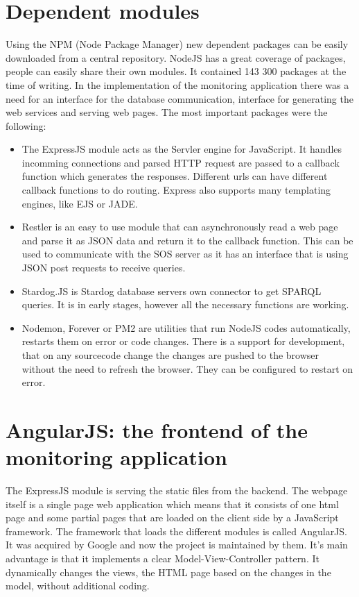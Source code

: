 \section{Dependent modules}

Using the NPM (Node Package Manager) new dependent packages can be easily downloaded from a central  repository. NodeJS has a great coverage of packages, people can easily share their own modules. It contained 143 300 packages at the time of writing. In the implementation of the monitoring application there was a need for an interface for the database communication, interface for generating the web services and serving web pages. The most important packages were the following: 
\begin{itemize}

\item The ExpressJS module acts as the Servler engine for JavaScript. It handles incomming connections and parsed HTTP request are passed to a callback function which generates the responses. Different urls can have different callback functions to do routing. Express also supports many templating engines, like EJS or JADE.

\item Restler is an easy to use module that can asynchronously read a web page and parse it as JSON data and return it to the callback function. This can be used to communicate with the SOS server as it has an interface that is using JSON post requests to 
receive queries.

\item Stardog.JS is Stardog database servers own connector to get SPARQL queries. It is in early stages, however all the necessary functions are working. 

\item Nodemon, Forever or PM2 are utilities that run NodeJS codes automatically, restarts them on error or code changes. There is a support for development, that on any sourcecode change the changes are pushed to the browser without the need to refresh the browser. They can be configured to restart on error.
\end{itemize}

\section{AngularJS: the frontend of the monitoring application}

The ExpressJS module is serving the static files from the backend. The webpage itself is a single page web application which means that it consists of one html page and some partial pages that are loaded on the client side by a JavaScript framework. The framework that loads the different modules is called AngularJS. It was acquired by Google and now the project is maintained by them\cite{angular}. It's main advantage is that it implements a clear Model-View-Controller pattern. It dynamically changes the views, the HTML page based on the changes in the model, without additional coding.

